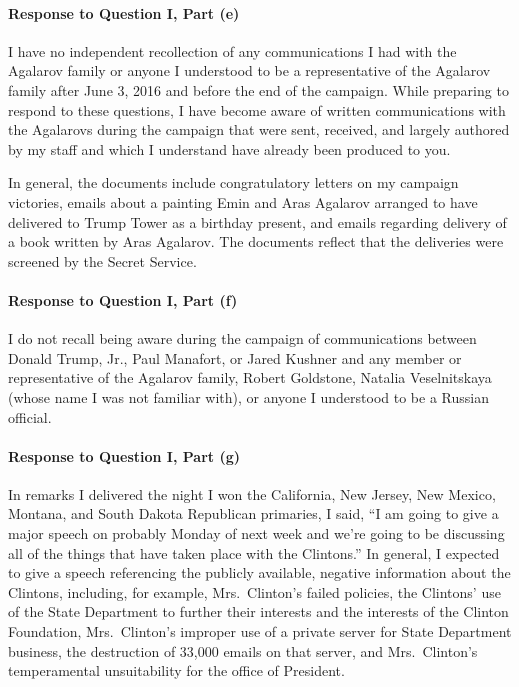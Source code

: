 \paragraph*{Response to Question I, Part (e)}

I have no independent recollection of any communications I had with the Agalarov family or anyone I understood to be a representative of the Agalarov family after June 3, 2016 and before the end of the campaign.
While preparing to respond to these questions, I have become aware of written communications with the Agalarovs during the campaign that were sent, received, and largely authored by my staff and which I understand have already been produced to you.

In general, the documents include congratulatory letters on my campaign victories, emails about a painting Emin and Aras Agalarov arranged to have delivered to Trump Tower as a birthday present, and emails regarding delivery of a book written by Aras Agalarov.
The documents reflect that the deliveries were screened by the Secret Service.

\paragraph*{Response to Question I, Part (f)}

I do not recall being aware during the campaign of communications between Donald Trump, Jr., Paul Manafort, or Jared Kushner and any member or representative of the Agalarov family, Robert Goldstone, Natalia Veselnitskaya (whose name I was not familiar with), or anyone I understood to be a Russian official.

\paragraph*{Response to Question I, Part (g)}

In remarks I delivered the night I won the California, New Jersey, New Mexico, Montana, and South Dakota Republican primaries, I said, “I am going to give a major speech on probably Monday of next week and we're going to be discussing all of the things that have taken place with the Clintons.”
In general, I expected to give a speech referencing the publicly available, negative information about the Clintons, including, for example, Mrs.~Clinton’s failed policies, the Clintons’ use of the State Department to further their interests and the interests of the Clinton Foundation, Mrs.~Clinton’s improper use of a private server for State Department business, the destruction of 33,000 emails on that server, and Mrs.~Clinton’s temperamental unsuitability for the office of President.

